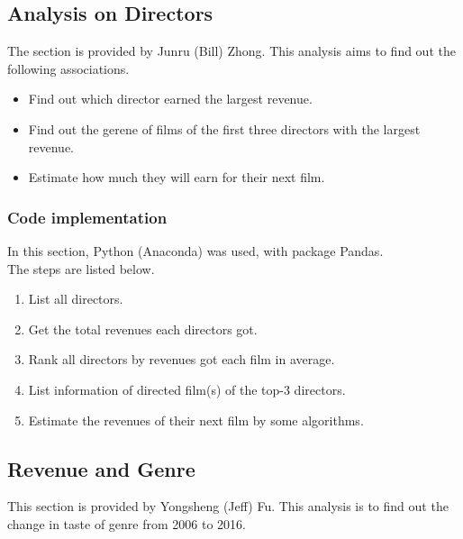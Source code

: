 \documentclass[10pt]{article}
\begin{document}
\begin{CJK}{UTF8}{gbsn}
            \subsection{Analysis on Directors}
            The section is provided by Junru (Bill) Zhong.
            This analysis aims to find out the following associations.
            \begin{itemize}
                \item Find out which director earned the largest revenue.
                \item Find out the gerene of films of the first three directors with the largest revenue.
                \item Estimate how much they will earn for their next film.
            \end{itemize}
                \subsubsection{Code implementation}
                In this section, Python (Anaconda) was used, with package Pandas.
                \\
                The steps are listed below.
                \begin{enumerate}
                    \item List all directors.
                    \item Get the total revenues each directors got.
                    \item Rank all directors by revenues got each film in average.
                    \item List information of directed film(s) of the top-3 directors.
                    \item Estimate the revenues of their next film by some algorithms.
                \end{enumerate}
            \subsection{Revenue and Genre}
            This section is provided by Yongsheng (Jeff) Fu.
            This analysis is to find out the change in taste of genre from 2006 to 2016.
    \end{CJK}
    
\end{document}

